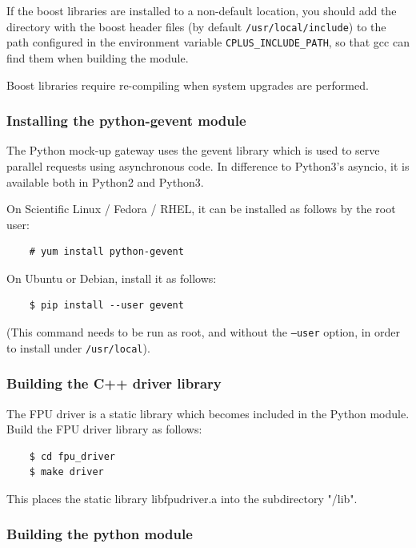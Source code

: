 \documentclass[11pt,a4paper]{scrartcl}
\begin{document}
If the boost libraries are installed to a non-default location, you
should add the directory with the boost header files (by default
\verb+/usr/local/include+) to the path configured in the environment
variable \verb+CPLUS_INCLUDE_PATH+, so that gcc can find them when
building the module.

Boost libraries require re-compiling when system upgrades are
performed.

\subsubsection{Installing the python-gevent module}
The Python mock-up gateway uses the gevent
library which is used to serve parallel requests
using asynchronous code. In difference to
Python3's asyncio, it is available both in
Python2 and Python3.

On Scientific Linux / Fedora / RHEL, it can be installed
as follows by the root user:

  \begin{verbatim}
    # yum install python-gevent
  \end{verbatim}    


On Ubuntu or Debian, install it as follows:

  \begin{verbatim}
    $ pip install --user gevent
  \end{verbatim}    

(This command needs to be run as root, and without the \texttt{--user}
  option, in order to install under \texttt{/usr/local}).



\subsubsection{Building the C++ driver library}
The FPU driver is a static library which becomes included in the
Python module.  Build the FPU driver library as follows:

  \begin{verbatim}
    $ cd fpu_driver
    $ make driver
  \end{verbatim}    

This places the static library libfpudriver.a into
the subdirectory "/lib".

\subsubsection{Building the python module}
\end{document}
